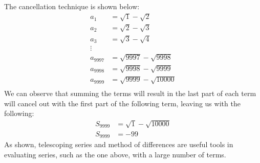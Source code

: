\documentclass[12pt]{article}
\begin{document}
The cancellation technique is shown below:
\begin{align*}
    a_1 & = \sqrt{1} - \sqrt{2} \\
    a_2 & = \sqrt{2} - \sqrt{3} \\
    a_3 & = \sqrt{3} - \sqrt{4} \\
    \vdots \\ 
    a_{9997} & = \sqrt{9997} - \sqrt{9998} \\
    a_{9998} & = \sqrt{9998} - \sqrt{9999} \\
    a_{9999} & = \sqrt{9999} - \sqrt{10000} \\
\end{align*}
We can observe that summing the terms will result in the last part of each term will cancel out with the first part of the following term, leaving us with the following:
\begin{align*}
    S_{9999} & = \sqrt{1}-\sqrt{10000} \\
    S_{9999} & = -99
\end{align*}
As shown, telescoping series and method of differences are useful tools in evaluating series, such as the one above, with a large number of terms. 
\end{document}
